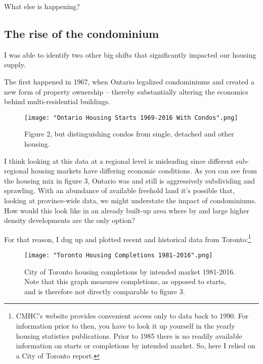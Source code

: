 What else is happening?

\subsection{The rise of the condominium}

I was able to identify two other big shifts that significantly impacted our housing supply. 

The first happened in 1967, when Ontario legalized condominiums and created a new form of property ownership -- thereby substantially altering the economics behind multi-residential buildings. 

\begin{figure}[ht]
\centering 
\texttt{[image: "Ontario Housing Starts 1969-2016 With Condos".png]}
\caption[Ontario housing starts by intended market and condos 1969-2016]{Figure 2, but distinguishing condos from single, detached and other housing.
}
\label{fig:figure3} 
\end{figure}

I think looking at this data at a regional level is misleading since different sub-regional housing markets have differing economic conditions. As you can see from the housing mix in figure 3, Ontario was and still is aggressively subdividing and sprawling. With an abundance of available freehold land it's possible that, looking at province-wide data, we might understate the impact of condominiums. How would this look like in an already built-up area where by and large higher density developments are the only option? 

For that reason, I dug up and plotted recent and historical data from Toronto:\footnote{\label{^note-digging} CMHC's website provides convenient access only to data back to 1990. For information prior to then, you have to look it up yourself in the yearly housing statistics publications. Prior to 1985 there is no readily available information on starts or completions by intended market. So, here I relied on a City of Toronto report. }

\begin{figure}[ht]
\centering 
\texttt{[image: "Toronto Housing Completions 1981-2016".png]}
\caption[City of Toronto housing completions by intended market 1981-2016.]{City of Toronto housing completions by intended market 1981-2016. Note that this graph measures completions, as opposed to starts, and is therefore not directly comparable to figure 3.}
\label{fig:figure4} 
\end{figure}


